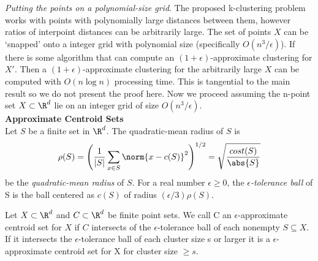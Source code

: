 \noindent \emph{Putting the points on a polynomial-size grid}. The proposed k-clustering problem works with points with polynomially large distances between them, however ratios of interpoint distances can be arbitrarily large. The set of points $X$ can be `snapped' onto a integer grid with polynomial size (specifically $O(n^3/\epsilon)$). If there is some algorithm that can compute an $(1+\epsilon)$-approximate clustering for $X'$. Then a $(1+\epsilon)$-approximate clustering for the arbitrarily large $X$ can be computed with $O(n \log n)$ processing time. This is tangential to the main result so we do not present the proof here. Now we proceed assuming the n-point set $X \subset \R^d$ lie on an integer grid of size $O(n^3/\epsilon)$.\\

\noindent \textbf{Approximate Centroid Sets}\\
Let $S$ be a finite set in $\R^d$. The quadratic-mean radius of $S$ is
\begin{align}
    \rho(S)  = \left( \frac{1}{|S|}\sum_{x\in S}\norm{x-c(S)}^2\right)^{1/2}
    = \sqrt{\frac{cost(S)}{\abs{S}}}
\end{align} 
be the \emph{quadratic-mean radius} of $S$. For a real number $\epsilon \geq 0$, the \emph{$\epsilon$-tolerance ball} of S is the ball centered as $c(S)$ of radius $(\epsilon/3)\rho(S)$.
\begin{definition}
Let $X \subset \R^d$ and $C \subset \R^d$ be finite point sets. We call C an $\epsilon$-approximate centroid set for $X$ if $C$ intersects of the $\epsilon$-tolerance ball of each nonempty $S \subseteq X$. If it intersects the $\epsilon$-tolerance ball  of each cluster size s or larger it is a $\epsilon$-approximate centroid set for X for cluster size $\geq s$.
\end{definition}

